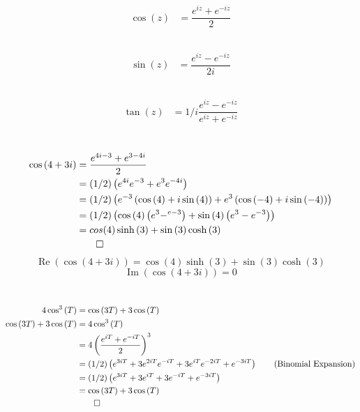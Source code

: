 \documentclass[12pt]{article}
\begin{document}
\section{}
\subsection{}
\begin{align*}
	\cos{(z)} &= \dfrac{e^{iz} + e^{-iz}}{2}
\end{align*}

\subsection{}
\begin{align*}
	\sin{(z)} &= \dfrac{e^{iz} - e^{-iz}}{2i}
\end{align*}

\subsection{}
\begin{align*}
	\tan{(z)} &= 1/i\dfrac{e^{iz} - e^{-iz}}{e^{iz} + e^{-iz}}
\end{align*}
\newpage

\section{}
\begin{align*}
	\cos{(4+3i)} &= \dfrac{e^{4i-3} + e^{3-4i}}{2}\\
	&= (1/2) \left(e^{4i}e^{-3} + e^{3}e^{-4i}\right)\\
	&= (1/2) \left(e^{-3}\left(\cos{(4)} + i\sin{(4)}\right) + e^{3}\left(\cos{(-4)} + i\sin{(-4)}\right)\right)\\
	&= (1/2) \left(\cos{(4)}\left(e^{3}-^{e-3}\right) + \sin{(4)}\left(e^{3}-e^{-3}\right)\right)\\
	&= cos{(4)}\sinh{(3)} + \sin{(3)}\cosh{(3)}\\
	&\qed
\end{align*}
\[ \operatorname{Re}{(\cos{(4+3i)})} = \cos{(4)}\sinh{(3)} + \sin{(3)}\cosh{(3)}\]
\[ \operatorname{Im}{(\cos{(4+3i)})} = 0 \]
\newpage

\section{}
\begin{align*}
	4\cos^3{(T)} &= \cos{(3T)} + 3\cos{(T)}\\
	\cos{(3T)} + 3\cos{(T)} &= 4\cos^3{(T)}\\
	&= 4 \left(\dfrac{e^{iT} + e^{-iT}}{2}\right)^{3}\\
	&= (1/2) \left(e^{3iT} + 3e^{2iT} e^{-iT} + 3e^{iT}e^{-2iT} + e^{-3iT}\right) \tag{Binomial Expansion} \\
	&= (1/2) \left(e^{3iT} + 3e^{iT} + 3e^{-iT} + e^{-3iT}\right)\\
	&= \cos{(3T)} + 3\cos{(T)}\\
	&\qed
\end{align*}
\newpage
\end{document}
